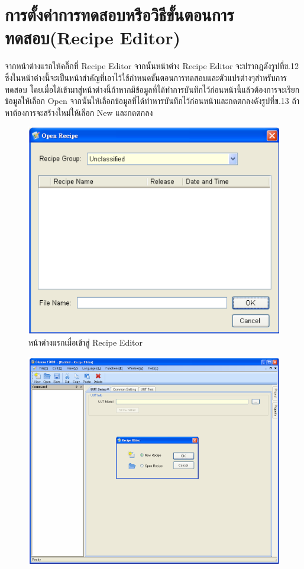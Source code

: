 \section{การตั้งค่าการทดสอบหรือวิธีขั้นตอนการทดสอบ(Recipe Editor)}
จากหน้าต่างแรกให้คลิ๊กที่ Recipe Editor จากนั้นหน้าต่าง Recipe Editor จะปรากฎดังรูปที่ข.12 ซึ่งในหน้าต่างนี้จะเป็นหน้าสำคัญที่เอาไว้ใช้กำหนดขั้นตอนการทดสอบและตัวแปรต่างๆสำหรับการทดสอบ
โดยเมื่อได้เข้ามาสู่หน้าต่างนี้ถ้าหากมีข้อมูลที่ได้ทำการบันทึกไว้ก่อนหน้านี้แล้วต้องการจะเรียกข้อมูลให้เลือก Open จากนั้นให้เลือกข้อมูลที่ได้ทำหารบันทึกไว้ก่อนหน้าและกดตกลงดังรูปที่ข.13
ถ้าหาต้องการจะสร้างใหม่ให้เลือก New และกดตกลง
\begin{center}
	\begin{figure}[H]
		\includegraphics[width=1\linewidth]{Chapters/img/17020_Program/Recipe_Editor/Recipe_dialog.png}
		\centering
		\captionsetup{justification=centering,margin=2cm}
		\caption{หน้าต่างแรกเมื่อเข้าสู่ Recipe Editor}
	\end{figure}
	\begin{figure}[H]
		\includegraphics[width=1\linewidth]{Chapters/img/17020_Program/Recipe_Editor/Recipe_editor_win.png}

\end{figure}
\end{center}
